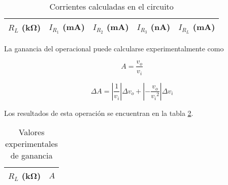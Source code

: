 \begin{table}[H]
    \centering
    \begin{tabular}{@{}rrrrr@{}}
        \toprule
        $R_L$ (\si{\kilo\ohm}) & $I_{R_1}$ (\si{\milli\ampere}) & $I_{R_2}$ (\si{\milli\ampere}) & $I_{R_3}$ (\si{\nano\ampere}) & $I_{R_L}$ (\si{\milli\ampere}) \\
        \midrule
        
    \end{tabular}
    \caption{Corrientes calculadas en el circuito}
    \label{tab:1-datos:corrientes}
\end{table}

La ganancia del operacional puede calcularse experimentalmente como

\begin{equation}
    \label{ec:1-teoria:ganancia-experimental}
    A = \frac{v_o}{v_i}
\end{equation}

\begin{equation}
    \label{ec:1-teoria:err-ganancia-experimental}
    \Delta A = \left| \frac{1}{v_i} \right| \Delta v_o + \left| -\frac{v_o}{{v_i}^2} \right| \Delta v_i
\end{equation}

Los resultados de esta operación se encuentran en la tabla \ref{tab:1-teoria:ganancia-experimental}.


\begin{table}[H]
    \centering
    \begin{tabular}{@{}rr@{}}
        \toprule
        $R_L$ (\si{\kilo\ohm}) & $A$ \\
        \midrule
        
    \end{tabular}
    \caption{Valores experimentales de ganancia}
    \label{tab:1-teoria:ganancia-experimental}
\end{table}
